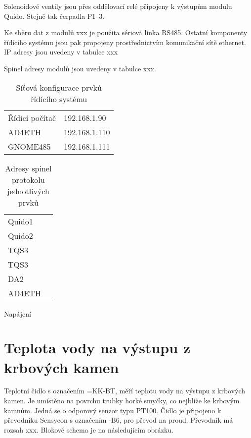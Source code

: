 \documentclass[a4paper,draft]{book}
\begin{document}
    Solenoidové ventily jsou přes oddělovací relé připojeny k výstupům modulu
    Quido. Stejně tak čerpadla P1--3.

    Ke sběru dat z modulů xxx je použita sériová linka RS485. Ostatní komponenty
    řídícího systému jsou pak propojeny prostřednictvím komunikační sítě
    ethernet. IP adresy jsou uvedeny v tabulce xxx

    Spinel adresy modulů jsou uvedeny v tabulce xxx.

    \begin{table}
      \centering
      \begin{tabular}{ll}
        Řídící počítač & 192.168.1.90 \\
        AD4ETH         & 192.168.1.110\\
        GNOME485       & 192.168.1.111\\
      \end{tabular}
      \caption{Síťová konfigurace prvků řídícího systému}
    \end{table}

    \begin{table}
      \centering
      \begin{tabular}{ll}
        Quido1 & \\
        Quido2 & \\
        TQS3   & \\
        TQS3   & \\
        DA2    & \\
        AD4ETH &
      \end{tabular}
      \caption{Adresy spinel protokolu jednotlivých prvků}
    \end{table}

    Napájení

    \section{Teplota vody na výstupu z krbových kamen}

        Teplotní čidlo s označením =KK-BT, měří teplotu vody na
        výstupu z krbových kamen. Je umístěno na povrchu
        trubky horké smyčky, co nejblíže ke krbovým kamnům. Jedná se o odporový
        senzor typu PT100. Čidlo je připojeno k převodníku
        Sensycon s označením -B6, pro převod na
        proud. Převodník má rozsah xxx. Blokové schema je na následujícím
        obrázku.

        \begin{tikzpicture}[scale=1.0]
        \end{tikzpicture}
\end{document}
